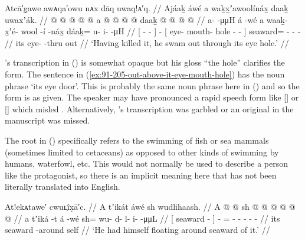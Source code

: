 \ex\label{ex:91-214-killed-swam-out}%
%
\begingl
	\glpreamble	Atcā′g̣awe awᴀqa′owu nᴀx dāq uwaq!ᴀ′q. //
	\glpreamble	Ajáaḵ áwé a waḵx̱ʼawoolínáx̱ daaḵ uwaxʼák. //
	\gla	{}  @ {} @ {} @ {} @ {} {}  @ {}
		{} a  @ {} @ {} @ {} @ {} {}
		daaḵ @  @ {} @ {} @ {} //
	\glb	{} a- {}  -μμH {} {} á -wé
		{} a waaḵ- x̱ʼé- wool -í -náx̱ {}
		dáaḵ= u- i-  -μH //
	\glc	{}[ - \·  - \· {}]
		 -
		{}[  eye- mouth- hole - - {}]
		seaward= - -  - //
	\gld	{}  {} {} {} {} {}  {}
		{} its eye-  {} {} -thru {}
		out  {} {} {} //
	\glft	‘Having killed it, he swam out through its eye hole.’
		//
\endgl
\xe

\citeauthor{swanton:1909}’s transcription  in (\lastx) is somewhat opaque but his gloss “the hole” clarifies the form.
The sentence in (\ref{ex:91-205-out-above-it-eye-mouth-hole}) has the noun phrase   ‘its eye door’.
This is probably the same noun phrase here in (\lastx) and so the form is  as given.
The speaker may have pronounced a rapid speech form like [] or [] which misled \citeauthor{swanton:1909}.
Alternatively, \citeauthor{swanton:1909}’s transcription was garbled or an original  in the manuscript was missed.

The root  in (\lastx) specifically refers to the swimming of fish or sea mammals (sometimes limited to cetaceans) as opposed to other kinds of swimming by humans, waterfowl, etc.
This would not normally be used to describe a person like the protagonist, so there is an implicit meaning here that has not been literally translated into English.

\ex\label{ex:91-215-float-seaward}%
%
\begingl
	\glpreamble	At!ekᴀtawe′ cwuʟ̣îx̣ā′c. //
	\glpreamble	A tʼikát áwé sh wudlihaash. //
	\gla	{} A  @ {} {}  @ {}
		sh @  @ {} @ {} @ {} @ {} @ {} //
	\glb	{} a tʼiká -t {} á -wé
		sh= wu- d- l- i-  -μμL //
	\glc	{}[  seaward - {}]  -
		= - - - -  - //
	\gld	{} its seaward -around {}  {}
		self  {} {} {} {} {} //
	\glft	‘He had himself floating around seaward of it.’
		//
\endgl
\xe

